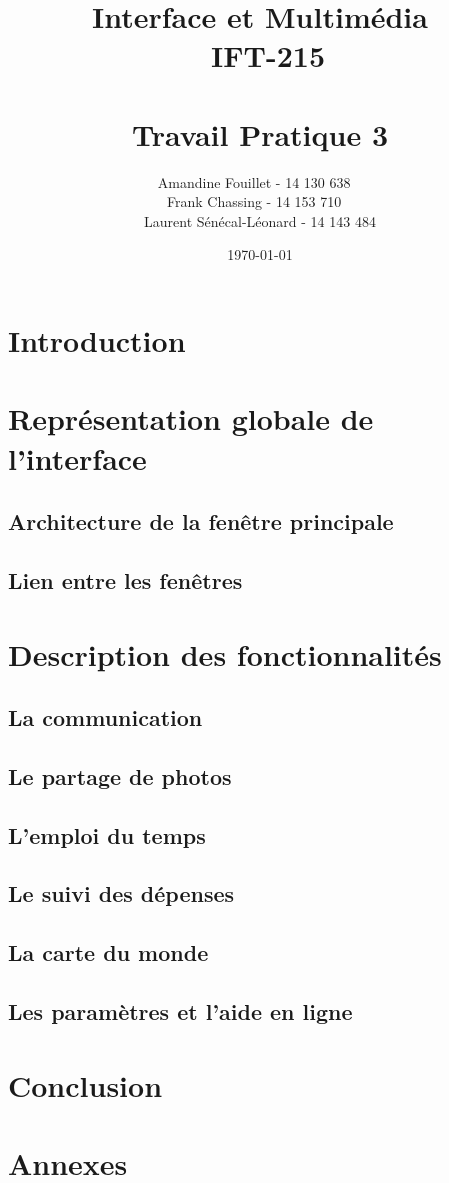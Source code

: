 \documentclass[12pt]{article}
\title{\vspace{\fill} Interface et Multimédia \\ ~\textbf{IFT-215} \\~\\ Travail Pratique 3}
\author{Amandine Fouillet - 14 130 638 ~\\ Frank Chassing - 14 153 710 ~\\ Laurent Sénécal-Léonard - 14 143 484}
\date{\today \vspace{\fill}}
\begin{document}
\maketitle
\newpage

\tableofcontents
\newpage
\section*{Introduction}


\section{Représentation globale de l'interface}
\subsection{Architecture de la fenêtre principale}
\subsection{Lien entre les fenêtres}

\newpage
\section{Description des fonctionnalités}
\subsection{La communication}
\subsection{Le partage de photos}
\subsection{L'emploi du temps}
\subsection{Le suivi des dépenses}
\subsection{La carte du monde}
\subsection{Les paramètres et l'aide en ligne}

\newpage
\section*{Conclusion}

\section*{Annexes}
\end{document}
